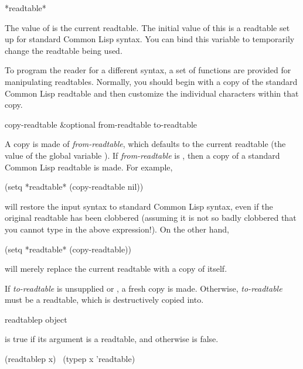 \begin{defun}[Variable]
*readtable*

The value of  is the current readtable.  The initial
value of this is a readtable set up for standard Common Lisp syntax.
You can bind this variable to temporarily change the readtable being used.
\end{defun}

To program the reader for a different syntax, a set of functions are
provided for manipulating readtables.  Normally, you should begin
with a copy of the standard Common Lisp readtable and then customize
the individual characters within that copy.

\begin{defun}[Function]
copy-readtable &optional from-readtable to-readtable

A copy is made of \emph{from-readtable}, which defaults to the current readtable
(the value of the global variable ).  If \emph{from-readtable}
is {\false}, then a copy of a standard Common Lisp readtable is made.
For example,
\begin{lisp}
(setq *readtable* (copy-readtable nil))
\end{lisp}
will restore the input syntax to standard Common Lisp syntax, even if
the original readtable has been clobbered (assuming it is not so
badly clobbered that you cannot type in the above expression!).
On the other hand,
\begin{lisp}
(setq *readtable* (copy-readtable))
\end{lisp}
will merely replace the current readtable with a copy of itself.

If \emph{to-readtable} is unsupplied or {\false}, a fresh copy is made.  Otherwise,
\emph{to-readtable} must be a readtable, which is destructively copied into.
\end{defun}

\begin{defun}[Function]
readtablep object

 is true if its argument is a readtable,
and otherwise is false.
\begin{lisp}
(readtablep x) \EQ\ (typep x 'readtable)
\end{lisp}
\end{defun}

